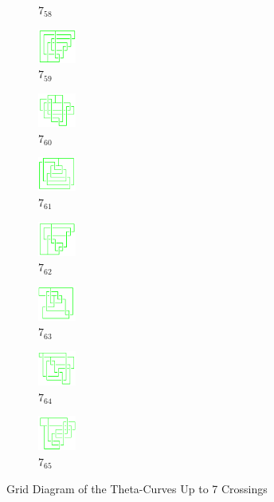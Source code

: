 \documentclass{article}
\theoremstyle{definition}
\theoremstyle{theorem}
\theoremstyle{proposition}
\theoremstyle{corollary}
\begin{document}
\begin{figure}[H]
\begin{subfigure}{0.075\textwidth}
    \caption{$7_{58}$} 
    \end{subfigure}
    \begin{subfigure}{0.075\textwidth}
    \includegraphics[width=1.25cm]{../Midterm_Poster/grid_diagram/theta_7_59.png}
    \caption{$7_{59}$} 
    \end{subfigure}
    \begin{subfigure}{0.075\textwidth}
    \includegraphics[width=1.25cm]{../Midterm_Poster/grid_diagram/theta_7_60.png}
    \caption{$7_{60}$} 
    \end{subfigure}
    \begin{subfigure}{0.075\textwidth}
    \includegraphics[width=1.25cm]{../Midterm_Poster/grid_diagram/theta_7_61.png}
    \caption{$7_{61}$} 
    \end{subfigure}
    \begin{subfigure}{0.075\textwidth}
    \includegraphics[width=1.25cm]{../Midterm_Poster/grid_diagram/theta_7_62.png}
    \caption{$7_{62}$} 
    \end{subfigure}
    \begin{subfigure}{0.075\textwidth}
    \includegraphics[width=1.25cm]{../Midterm_Poster/grid_diagram/theta_7_63.png}
    \caption{$7_{63}$} 
    \end{subfigure}
    \begin{subfigure}{0.075\textwidth}
    \includegraphics[width=1.25cm]{../Midterm_Poster/grid_diagram/theta_7_64.png}
    \caption{$7_{64}$} 
    \end{subfigure}
    \begin{subfigure}{0.075\textwidth}
    \includegraphics[width=1.25cm]{../Midterm_Poster/grid_diagram/theta_7_65.png}
    \caption{$7_{65}$} 
    \end{subfigure}
    \caption{Grid Diagram of the Theta-Curves Up to 7 Crossings}
  \end{figure}
\end{document}
